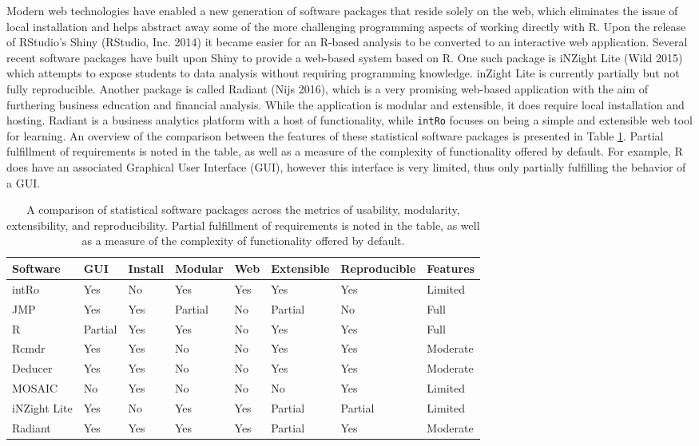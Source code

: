 \documentclass[12pt,]{article}
\begin{document}
Modern web technologies have enabled a new generation of software
packages that reside solely on the web, which eliminates the issue of
local installation and helps abstract away some of the more challenging
programming aspects of working directly with R. Upon the release of
RStudio's Shiny (RStudio, Inc. 2014) it became easier for an R-based
analysis to be converted to an interactive web application. Several
recent software packages have built upon Shiny to provide a web-based
system based on R. One such package is iNZight Lite (Wild 2015) which
attempts to expose students to data analysis without requiring
programming knowledge. inZight Lite is currently partially but not fully
reproducible. Another package is called Radiant (Nijs 2016), which is a
very promising web-based application with the aim of furthering business
education and financial analysis. While the application is modular and
extensible, it does require local installation and hosting. Radiant is a
business analytics platform with a host of functionality, while
\texttt{intRo} focuses on being a simple and extensible web tool for
learning. An overview of the comparison between the features of these
statistical software packages is presented in Table \ref{tab:compare}.
Partial fulfillment of requirements is noted in the table, as well as a
measure of the complexity of functionality offered by default. For
example, R does have an associated Graphical User Interface (GUI),
however this interface is very limited, thus only partially fulfilling
the behavior of a GUI.

\begin{table}[ht]
\centering
\begin{tabular}{llllllll}
  \hline
Software & GUI & Install & Modular & Web & Extensible & Reproducible & Features \\ 
  \hline
intRo & Yes & No & Yes & Yes & Yes & Yes & Limited \\ 
  JMP & Yes & Yes & Partial & No & Partial & No & Full \\ 
  R & Partial & Yes & Yes & No & Yes & Yes & Full \\ 
  Rcmdr & Yes & Yes & No & No & Yes & Yes & Moderate \\ 
  Deducer & Yes & Yes & No & No & Yes & Yes & Moderate \\ 
  MOSAIC & No & Yes & No & No & No & Yes & Limited \\ 
  iNZight Lite & Yes & No & Yes & Yes & Partial & Partial & Limited \\ 
  Radiant & Yes & Yes & Yes & Yes & Partial & Yes & Moderate \\ 
   \hline
\end{tabular}
\caption{A comparison of statistical software packages across the metrics of usability, modularity, extensibility, and reproducibility. Partial fulfillment of requirements is noted in the table, as well as a measure of the complexity of functionality offered by default.} 
\label{tab:compare}
\end{table}
\end{document}

